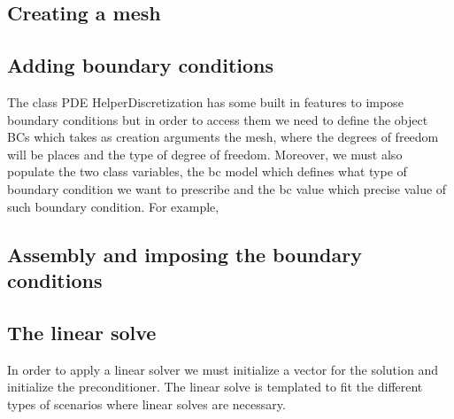 \subsection{Creating a mesh}


\subsection{Adding boundary conditions} 
The class PDE HelperDiscretization has some built in features to
impose boundary conditions but in order to access them we need to define the object BCs which takes
as creation arguments the mesh, where the degrees of freedom will be places and the type of degree of
freedom. Moreover, we must also populate the two class variables, the bc model which defines what type of
boundary condition we want to prescribe and the bc value which precise value of such boundary condition.
For example,


\subsection{Assembly and imposing the boundary conditions}


\subsection{The linear solve}
In order to apply a linear solver we must initialize a vector for the solution and
initialize the preconditioner. The linear solve is templated to fit the different types of scenarios where linear
solves are necessary.



